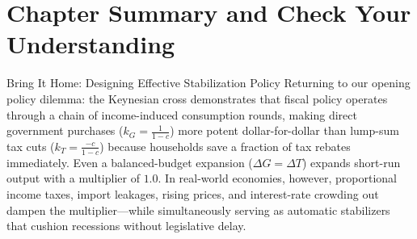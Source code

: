 \documentclass[11pt,letterpaper]{article}
\begin{document}
\section{Chapter Summary and Check Your Understanding}

\begin{examplecase}{Bring It Home: Designing Effective Stabilization Policy}
Returning to our opening policy dilemma: the Keynesian cross demonstrates that fiscal policy operates through a chain of income-induced consumption rounds, making direct government purchases ($k_G = \frac{1}{1-c}$) more potent dollar-for-dollar than lump-sum tax cuts ($k_T = \frac{-c}{1-c}$) because households save a fraction of tax rebates immediately. Even a balanced-budget expansion ($\Delta G = \Delta T$) expands short-run output with a multiplier of $1.0$. In real-world economies, however, proportional income taxes, import leakages, rising prices, and interest-rate crowding out dampen the multiplier—while simultaneously serving as automatic stabilizers that cushion recessions without legislative delay.
\end{examplecase}
\end{document}
